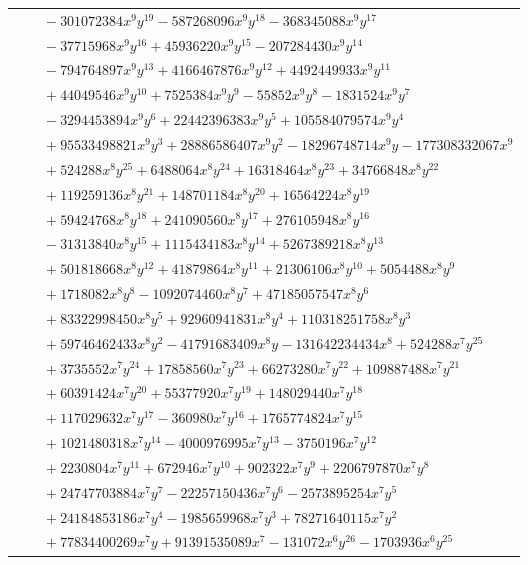 \documentclass[11pt]{article}
\begin{document}
\begin{longtable}{@{}ll@{}}
 & $\quad -301072384x^{9}y^{19}-587268096x^{9}y^{18}-368345088x^{9}y^{17}$\\
 & $\quad -37715968x^{9}y^{16}+45936220x^{9}y^{15}-207284430x^{9}y^{14}$\\
 & $\quad -794764897x^{9}y^{13}+4166467876x^{9}y^{12}+4492449933x^{9}y^{11}$\\
 & $\quad +44049546x^{9}y^{10}+7525384x^{9}y^{9}-55852x^{9}y^{8}-1831524x^{9}y^{7}$\\
 & $\quad -3294453894x^{9}y^{6}+22442396383x^{9}y^{5}+105584079574x^{9}y^{4}$\\
 & $\quad +95533498821x^{9}y^{3}+28886586407x^{9}y^{2}-18296748714x^{9}y-177308332067x^{9}$\\
 & $\quad +524288x^{8}y^{25}+6488064x^{8}y^{24}+16318464x^{8}y^{23}+34766848x^{8}y^{22}$\\
 & $\quad +119259136x^{8}y^{21}+148701184x^{8}y^{20}+16564224x^{8}y^{19}$\\
 & $\quad +59424768x^{8}y^{18}+241090560x^{8}y^{17}+276105948x^{8}y^{16}$\\
 & $\quad -31313840x^{8}y^{15}+1115434183x^{8}y^{14}+5267389218x^{8}y^{13}$\\
 & $\quad +501818668x^{8}y^{12}+41879864x^{8}y^{11}+21306106x^{8}y^{10}+5054488x^{8}y^{9}$\\
 & $\quad +1718082x^{8}y^{8}-1092074460x^{8}y^{7}+47185057547x^{8}y^{6}$\\
 & $\quad +83322998450x^{8}y^{5}+92960941831x^{8}y^{4}+110318251758x^{8}y^{3}$\\
 & $\quad +59746462433x^{8}y^{2}-41791683409x^{8}y-131642234434x^{8}+524288x^{7}y^{25}$\\
 & $\quad +3735552x^{7}y^{24}+17858560x^{7}y^{23}+66273280x^{7}y^{22}+109887488x^{7}y^{21}$\\
 & $\quad +60391424x^{7}y^{20}+55377920x^{7}y^{19}+148029440x^{7}y^{18}$\\
 & $\quad +117029632x^{7}y^{17}-360980x^{7}y^{16}+1765774824x^{7}y^{15}$\\
 & $\quad +1021480318x^{7}y^{14}-4000976995x^{7}y^{13}-3750196x^{7}y^{12}$\\
 & $\quad +2230804x^{7}y^{11}+672946x^{7}y^{10}+902322x^{7}y^{9}+2206797870x^{7}y^{8}$\\
 & $\quad +24747703884x^{7}y^{7}-22257150436x^{7}y^{6}-2573895254x^{7}y^{5}$\\
 & $\quad +24184853186x^{7}y^{4}-1985659968x^{7}y^{3}+78271640115x^{7}y^{2}$\\
 & $\quad +77834400269x^{7}y+91391535089x^{7}-131072x^{6}y^{26}-1703936x^{6}y^{25}$\\

\end{longtable}
\end{document}
